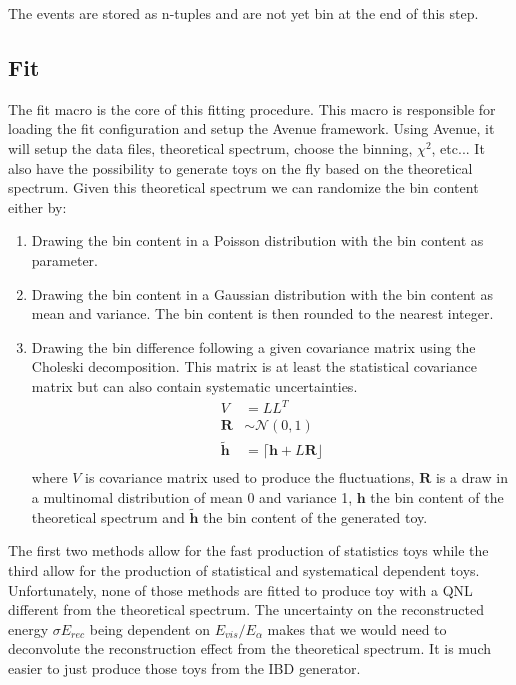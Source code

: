 \documentclass[../main.tex]{subfiles}
\begin{document}
The events are stored as n-tuples and are not yet bin at the end of this step.

%

\subsection{Fit}
\label{sec:joint_fit:framework:fit}

The fit macro is the core of this fitting procedure. This macro is responsible for loading the fit configuration and setup the Avenue framework. Using Avenue, it will setup the data files, theoretical spectrum, choose the binning, $\chi^2$, etc... It also have the possibility to generate toys on the fly based on the theoretical spectrum. Given this theoretical spectrum we can randomize the bin content either by:
\begin{enumerate}
  \item Drawing the bin content in a Poisson distribution with the bin content as parameter.
  \item Drawing the bin content in a Gaussian distribution with the bin content as mean and variance. The bin content is then rounded to the nearest integer.
  \item Drawing the bin difference following a given covariance matrix using the Choleski decomposition. This matrix is at least the statistical covariance matrix but can also contain systematic uncertainties.
    \begin{align}
      V &= LL^T \\
      \mathbf{R} &\sim \mathcal{N}(0, 1) \\
      \tilde{\mathbf{h}} &= \lceil \mathbf{h} + L\mathbf{R} \rfloor \\
    \end{align}
    where $V$ is covariance matrix used to produce the fluctuations, $\mathbf{R}$ is a draw in a multinomal distribution of mean 0 and variance 1, $\mathbf{h}$ the bin content of the theoretical spectrum and $\tilde{\mathbf{h}}$ the bin content of the generated toy.
\end{enumerate}

The first two methods allow for the fast production of statistics toys while the third allow for the production of statistical and systematical dependent toys. Unfortunately, none of those methods are fitted to produce toy with a QNL different from the theoretical spectrum. The uncertainty on the reconstructed energy $\sigma E_{rec}$ being dependent on $E_{vis}/E_{\alpha}$ makes that we would need to deconvolute the reconstruction effect from the theoretical spectrum. It is much easier to just produce those toys from the IBD generator.
\end{document}
